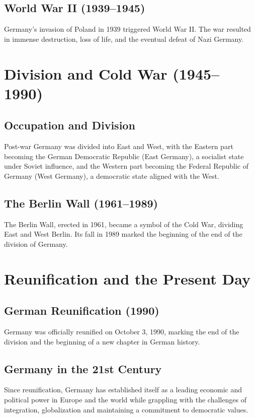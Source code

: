 \documentclass{book}
\begin{document}
\subsection{World War II (1939–1945)}
Germany’s invasion of Poland in 1939 triggered World War II. The war resulted in immense destruction, loss of life, and the eventual defeat of Nazi Germany.

\section{Division and Cold War (1945–1990)}
\label{sec:division-cold-war}
\subsection{Occupation and Division}
Post-war Germany was divided into East and West, with the Eastern part becoming the German Democratic Republic (East Germany), a socialist state under Soviet influence, and the Western part becoming the Federal Republic of Germany (West Germany), a democratic state aligned with the West.

\subsection{The Berlin Wall (1961–1989)}
The Berlin Wall, erected in 1961, became a symbol of the Cold War, dividing East and West Berlin. Its fall in 1989 marked the beginning of the end of the division of Germany.

\section{Reunification and the Present Day}
\label{sec:reunification-present-day}
\subsection{German Reunification (1990)}
Germany was officially reunified on October 3, 1990, marking the end of the division and the beginning of a new chapter in German history.

\subsection{Germany in the 21st Century}
Since reunification, Germany has established itself as a leading economic and political power in Europe and the world while grappling with the challenges of integration, globalization and maintaining a commitment to democratic values.
\end{document}
